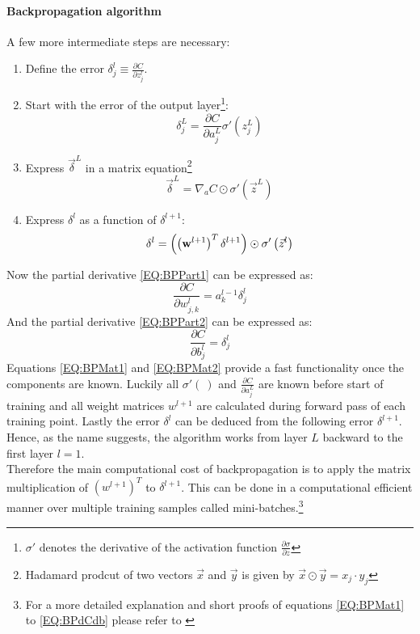 			\paragraph{Backpropagation algorithm}
				A few  more intermediate steps are necessary:
				\begin{enumerate}
					\item Define the error $\delta^l_j \equiv \frac{\partial C}{\partial z^l_j}$.
					\item Start with the error of the output layer\footnote{$\sigma'$ denotes the derivative of the activation function $\frac{\partial\sigma}{\partial z}$}: 
					\begin{equation}
						\delta^L_j = \frac{\partial C}{\partial a^L_j}\sigma'\left(z^L_j\right)
						\label{EQ:BPDel}
					\end{equation}
					\item Express $\vec{\delta}^L$ in a matrix equation\footnote{Hadamard prodcut of two vectors $\vec{x}$ and $\vec{y}$ is given by $\vec{x} \odot \vec{y}= x_j \cdot y_j$}
					\begin{equation}
						\vec{\delta}^L = \nabla_a C \odot \sigma'\left(\vec{z}^L\right)
						\label{EQ:BPMat1}
					\end{equation}
					\item Express $\delta^l$ as a function of $\delta^{l+1}$:
						\begin{equation}
							\delta^l = \left(\left(\mathbf{w}^{l+1}\right)^T \delta^{l+1}\right) \odot \sigma'\left(\vec{z}^l\right)
							\label{EQ:BPMat2}
						\end{equation}
				\end{enumerate}
				Now the partial derivative \ref{EQ:BPPart1} can be expressed as:
				\begin{equation}
					\frac{\partial C}{\partial w^l_{j,k}} = a^{l-1}_k \delta^l_j
					\label{EQ:BPdCdw}
				\end{equation}
				And the partial derivative \ref{EQ:BPPart2} can be expressed as:
				\begin{equation}
					\frac{\partial C}{\partial b^l_j} = \delta^l_j
					\label{EQ:BPdCdb}
				\end{equation}
				Equations \ref{EQ:BPMat1} and \ref{EQ:BPMat2} provide a fast functionality once the components are known. Luckily all $\sigma'(\:)$ and $\frac{\partial C}{\partial a^L_j}$ are known before start of training and all weight matrices $w^{l+1}$ are calculated during forward pass of each training point. Lastly the error $\delta^l$ can be deduced from the following error $\delta^{l+1}$. Hence, as the name suggests, the algorithm works from layer $L$ backward to the first layer $l=1$.\\
				Therefore the main computational cost of backpropagation is to apply the matrix multiplication of $\left(w^{l+1}\right)^T$ to $\delta^{l+1}$. This can be done in a computational efficient manner over multiple training samples called mini-batches.\footnote{For a more detailed explanation and short proofs of equations \ref{EQ:BPMat1} to \ref{EQ:BPdCdb} please refer to \cite{NNEBook}}

